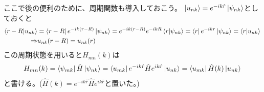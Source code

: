 \documentclass[a4paper,12pt]{jsarticle}
\begin{document}
ここで後の便利のために、周期関数も導入しておこう。
$\ket{u_{nk}} = e^{-ik\hat{r}}\ket{\psi_{nk}}$としておくと
\begin{align}
  \braket{r-R}{u_{nk}} &= \bra{r-R}e^{-ik(r-R)}\ket{\psi_{nk}} = e^{-ik(r-R)}e^{-ikR}\braket{r}{\psi_{nk}} = \bra{r}e^{-ikr}\ket{\psi_{nk}} = \braket{r}{u_{nk}}\\
  \Rightarrow & u_{nk}(r-R) = u_{nk}(r)
\end{align}
この周期状態を用いると$H_{mn}(k)$は
\begin{align}
  H_{mn}(k) = \bra{\psi_{mk}}\hat{H}\ket{\psi_{nk}} = \bra{u_{mk}}e^{-ik\hat{r}}\hat{H}e^{ik\hat{r}}\ket{u_{nk}} = \bra{u_{mk}}\hat{H}(k)\ket{u_{nk}} 
\end{align}
と書ける。($\hat{H}(k) = e^{-ik\hat{r}}\hat{H}e^{ik\hat{r}}$と置いた。)

\end{document}
